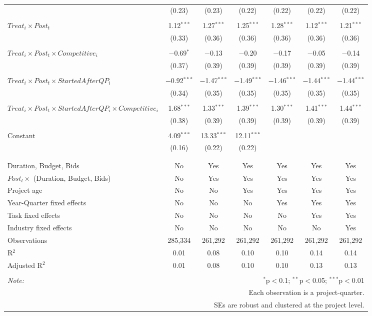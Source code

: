 \documentclass[
]{article}
\begin{document}
\begin{table}[H]
\begin{tabular}{@{\extracolsep{-3pt}}lcccccc}
  & (0.23) & (0.23) & (0.22) & (0.22) & (0.22) & (0.22) \\ 
  & & & & & & \\ 
 $Treat_i \times Post_t$ & 1.12$^{***}$ & 1.27$^{***}$ & 1.25$^{***}$ & 1.28$^{***}$ & 1.12$^{***}$ & 1.21$^{***}$ \\ 
  & (0.33) & (0.36) & (0.36) & (0.36) & (0.36) & (0.36) \\ 
  & & & & & & \\ 
 $Treat_i \times Post_t \times Competitive_i$ & $-$0.69$^{*}$ & $-$0.13 & $-$0.20 & $-$0.17 & $-$0.05 & $-$0.14 \\ 
  & (0.37) & (0.39) & (0.39) & (0.39) & (0.39) & (0.39) \\ 
  & & & & & & \\ 
 $Treat_i \times Post_t \times StartedAfterQP_i$ & $-$0.92$^{***}$ & $-$1.47$^{***}$ & $-$1.49$^{***}$ & $-$1.46$^{***}$ & $-$1.44$^{***}$ & $-$1.44$^{***}$ \\ 
  & (0.34) & (0.35) & (0.35) & (0.35) & (0.35) & (0.35) \\ 
  & & & & & & \\ 
 $Treat_i \times Post_t \times StartedAfterQP_i \times Competitive_i$ & 1.68$^{***}$ & 1.33$^{***}$ & 1.39$^{***}$ & 1.30$^{***}$ & 1.41$^{***}$ & 1.44$^{***}$ \\ 
  & (0.38) & (0.39) & (0.39) & (0.39) & (0.39) & (0.39) \\ 
  & & & & & & \\ 
 Constant & 4.09$^{***}$ & 13.33$^{***}$ & 12.11$^{***}$ &  &  &  \\ 
  & (0.16) & (0.22) & (0.22) &  &  &  \\ 
  & & & & & & \\ 
\hline \\[-1.8ex] 
Duration, Budget, Bids & No & Yes & Yes & Yes & Yes & Yes \\ 
$Post_t \times $  (Duration, Budget, Bids) & No & Yes & Yes & Yes & Yes & Yes \\ 
Project age & No & No & Yes & Yes & Yes & Yes \\ 
Year-Quarter fixed effects & No & No & No & Yes & Yes & Yes \\ 
Task fixed effects & No & No & No & No & Yes & Yes \\ 
Industry fixed effects & No & No & No & No & No & Yes \\ 
Observations & 285,334 & 261,292 & 261,292 & 261,292 & 261,292 & 261,292 \\ 
R$^{2}$ & 0.01 & 0.08 & 0.10 & 0.10 & 0.14 & 0.14 \\ 
Adjusted R$^{2}$ & 0.01 & 0.08 & 0.10 & 0.10 & 0.13 & 0.13 \\ 
\hline 
\hline \\[-1.8ex] 
\textit{Note:}  & \multicolumn{6}{r}{$^{*}$p$<$0.1; $^{**}$p$<$0.05; $^{***}$p$<$0.01} \\ 
 & \multicolumn{6}{r}{Each observation is a project-quarter.} \\ 
 & \multicolumn{6}{r}{SEs are robust and clustered at the project level.} \\ 
\end{tabular} 
\end{table}
\end{document}
